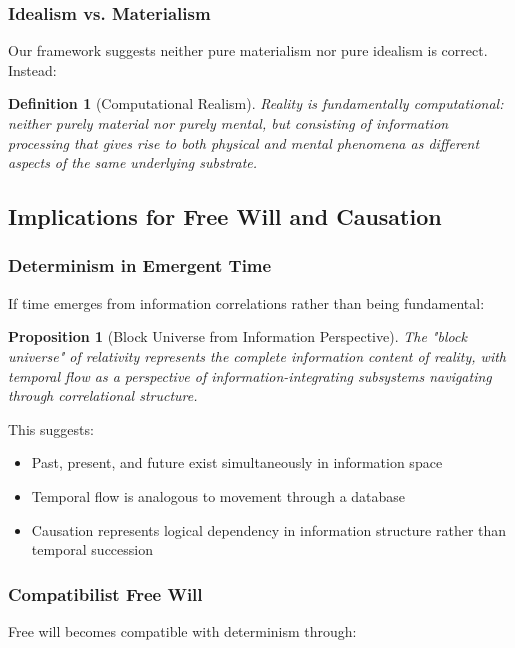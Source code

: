 \documentclass[12pt,a4paper]{article}
\newtheorem{definition}[theorem]{Definition}
\newtheorem{proposition}[theorem]{Proposition}
\theoremstyle{remark}
\begin{document}
\subsubsection{Idealism vs. Materialism}

Our framework suggests neither pure materialism nor pure idealism is correct. Instead:

\begin{definition}[Computational Realism]
Reality is fundamentally computational: neither purely material nor purely mental, but consisting of information processing that gives rise to both physical and mental phenomena as different aspects of the same underlying substrate.
\end{definition}

\subsection{Implications for Free Will and Causation}

\subsubsection{Determinism in Emergent Time}

If time emerges from information correlations rather than being fundamental:

\begin{proposition}[Block Universe from Information Perspective]
The "block universe" of relativity represents the complete information content of reality, with temporal flow as a perspective of information-integrating subsystems navigating through correlational structure.
\end{proposition}

This suggests:
\begin{itemize}
\item Past, present, and future exist simultaneously in information space
\item Temporal flow is analogous to movement through a database
\item Causation represents logical dependency in information structure rather than temporal succession
\end{itemize}

\subsubsection{Compatibilist Free Will}

Free will becomes compatible with determinism through:
\end{document}

